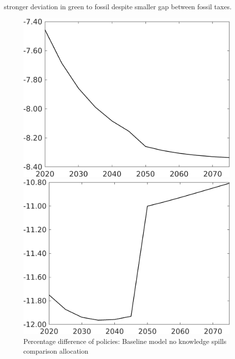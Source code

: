 \documentclass[12pt]{article}
\begin{document}
stronger deviation in green to fossil despite smaller gap between fossil taxes. 
\begin{figure}[h!!]
	\centering
	\caption{Percentage difference of policies: Baseline model no knowledge spills comparison allocation}\label{fig:Pertauf_nsk0_xgr0_noknow2}
	
	\begin{minipage}[]{0.32\textwidth}
		\includegraphics[width=1\textwidth]{../../codding_model/own_basedOnFried/optimalPol_010922_revision/figures/all_13Sept22/CompTaufPER_bytaul_Equlab_Reg0_N_spillover0_nsk0_xgr0_knspil1_sep1_LFlimit1_emsbase0_countec0_GovRev0_etaa0.79_lgd0.png}
	\end{minipage}	
	\begin{minipage}[]{0.32\textwidth}
		\includegraphics[width=1\textwidth]{../../codding_model/own_basedOnFried/optimalPol_010922_revision/figures/all_13Sept22/CompTaufPER_bytaul_Equlab_Reg0_G_spillover0_nsk0_xgr0_knspil1_sep1_LFlimit1_emsbase0_countec0_GovRev0_etaa0.79_lgd0.png}

\end{minipage}
\end{figure}
\end{document}
